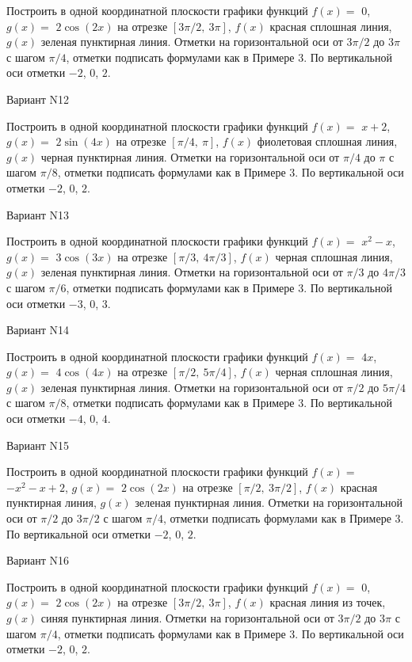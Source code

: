 \documentclass[11pt]{report}
\begin{document}
Построить в одной координатной плоскости графики функций $f(x) = $
    $0$, $g(x) = $
    $2 \cos{\left(2 x \right)}$ на 
    отрезке $\left[ 3 \pi / 2, \  3 \pi\right]$, $f(x)$ красная 
    сплошная линия, $g(x)$ зеленая пунктирная линия. 
    Отметки на горизонтальной оси от $3 \pi / 2$ до $3 \pi$ с 
    шагом $\pi / 4$, отметки подписать формулами как в Примере 3.  
    По вертикальной оси отметки $-2$, 0, $2$.

Вариант N12

Построить в одной координатной плоскости графики функций $f(x) = $
    $x + 2$, $g(x) = $
    $2 \sin{\left(4 x \right)}$ на 
    отрезке $\left[ \pi / 4, \  \pi\right]$, $f(x)$ фиолетовая 
    сплошная линия, $g(x)$ черная пунктирная линия. 
    Отметки на горизонтальной оси от $\pi / 4$ до $\pi$ с 
    шагом $\pi / 8$, отметки подписать формулами как в Примере 3.  
    По вертикальной оси отметки $-2$, 0, $2$.

Вариант N13

Построить в одной координатной плоскости графики функций $f(x) = $
    $x^{2} - x$, $g(x) = $
    $3 \cos{\left(3 x \right)}$ на 
    отрезке $\left[ \pi / 3, \  4 \pi / 3\right]$, $f(x)$ черная 
    сплошная линия, $g(x)$ зеленая пунктирная линия. 
    Отметки на горизонтальной оси от $\pi / 3$ до $4 \pi / 3$ с 
    шагом $\pi / 6$, отметки подписать формулами как в Примере 3.  
    По вертикальной оси отметки $-3$, 0, $3$.

Вариант N14

Построить в одной координатной плоскости графики функций $f(x) = $
    $4 x$, $g(x) = $
    $4 \cos{\left(4 x \right)}$ на 
    отрезке $\left[ \pi / 2, \  5 \pi / 4\right]$, $f(x)$ черная 
    сплошная линия, $g(x)$ зеленая пунктирная линия. 
    Отметки на горизонтальной оси от $\pi / 2$ до $5 \pi / 4$ с 
    шагом $\pi / 8$, отметки подписать формулами как в Примере 3.  
    По вертикальной оси отметки $-4$, 0, $4$.

Вариант N15

Построить в одной координатной плоскости графики функций $f(x) = $
    $- x^{2} - x + 2$, $g(x) = $
    $2 \cos{\left(2 x \right)}$ на 
    отрезке $\left[ \pi / 2, \  3 \pi / 2\right]$, $f(x)$ красная 
    пунктирная линия, $g(x)$ зеленая пунктирная линия. 
    Отметки на горизонтальной оси от $\pi / 2$ до $3 \pi / 2$ с 
    шагом $\pi / 4$, отметки подписать формулами как в Примере 3.  
    По вертикальной оси отметки $-2$, 0, $2$.

Вариант N16

Построить в одной координатной плоскости графики функций $f(x) = $
    $0$, $g(x) = $
    $2 \cos{\left(2 x \right)}$ на 
    отрезке $\left[ 3 \pi / 2, \  3 \pi\right]$, $f(x)$ красная 
    линия из точек, $g(x)$ синяя пунктирная линия. 
    Отметки на горизонтальной оси от $3 \pi / 2$ до $3 \pi$ с 
    шагом $\pi / 4$, отметки подписать формулами как в Примере 3.  
    По вертикальной оси отметки $-2$, 0, $2$.
\end{document}

